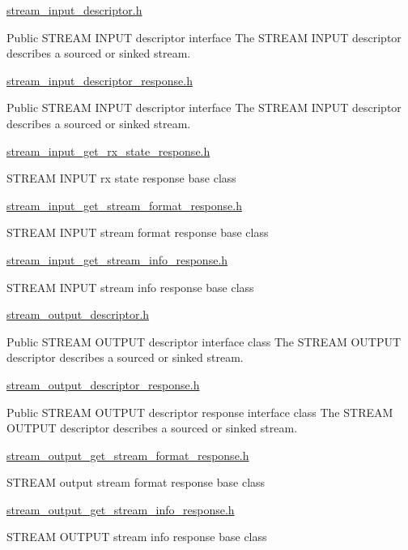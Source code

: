 \hyperlink{stream__input__descriptor_8h}{stream\+\_\+input\+\_\+descriptor.\+h}

Public S\+T\+R\+E\+AM I\+N\+P\+UT descriptor interface The S\+T\+R\+E\+AM I\+N\+P\+UT descriptor describes a sourced or sinked stream.

\hyperlink{stream__input__descriptor__response_8h}{stream\+\_\+input\+\_\+descriptor\+\_\+response.\+h}

Public S\+T\+R\+E\+AM I\+N\+P\+UT descriptor interface The S\+T\+R\+E\+AM I\+N\+P\+UT descriptor describes a sourced or sinked stream.

\hyperlink{stream__input__get__rx__state__response_8h}{stream\+\_\+input\+\_\+get\+\_\+rx\+\_\+state\+\_\+response.\+h}

S\+T\+R\+E\+AM I\+N\+P\+UT rx state response base class

\hyperlink{stream__input__get__stream__format__response_8h}{stream\+\_\+input\+\_\+get\+\_\+stream\+\_\+format\+\_\+response.\+h}

S\+T\+R\+E\+AM I\+N\+P\+UT stream format response base class

\hyperlink{stream__input__get__stream__info__response_8h}{stream\+\_\+input\+\_\+get\+\_\+stream\+\_\+info\+\_\+response.\+h}

S\+T\+R\+E\+AM I\+N\+P\+UT stream info response base class

\hyperlink{stream__output__descriptor_8h}{stream\+\_\+output\+\_\+descriptor.\+h}

Public S\+T\+R\+E\+AM O\+U\+T\+P\+UT descriptor interface class The S\+T\+R\+E\+AM O\+U\+T\+P\+UT descriptor describes a sourced or sinked stream.

\hyperlink{stream__output__descriptor__response_8h}{stream\+\_\+output\+\_\+descriptor\+\_\+response.\+h}

Public S\+T\+R\+E\+AM O\+U\+T\+P\+UT descriptor response interface class The S\+T\+R\+E\+AM O\+U\+T\+P\+UT descriptor describes a sourced or sinked stream.

\hyperlink{stream__output__get__stream__format__response_8h}{stream\+\_\+output\+\_\+get\+\_\+stream\+\_\+format\+\_\+response.\+h}

S\+T\+R\+E\+AM output stream format response base class

\hyperlink{stream__output__get__stream__info__response_8h}{stream\+\_\+output\+\_\+get\+\_\+stream\+\_\+info\+\_\+response.\+h}

S\+T\+R\+E\+AM O\+U\+T\+P\+UT stream info response base class

